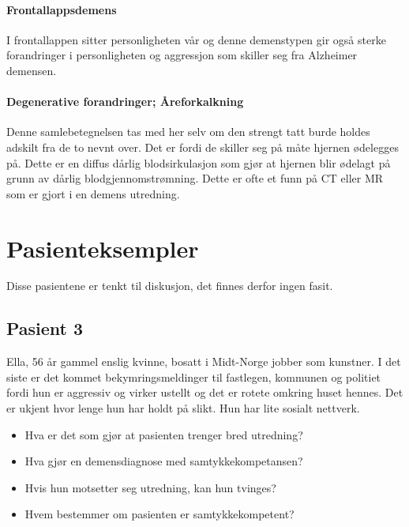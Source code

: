 					\paragraph{Frontallappsdemens\\}
						I frontallappen sitter personligheten vår og denne demenstypen gir også sterke forandringer i personligheten og aggressjon som skiller seg fra Alzheimer demensen.
					\paragraph{Degenerative forandringer; Åreforkalkning\\}
						Denne samlebetegnelsen tas med her selv om den strengt tatt burde holdes adskilt fra de to nevnt over. Det er fordi de skiller seg på måte hjernen ødelegges på. Dette er en diffus dårlig blodsirkulasjon som gjør at hjernen blir ødelagt på grunn av dårlig blodgjennomstrømning. Dette er ofte et funn på CT eller MR som er gjort i en demens utredning.
		\section{Pasienteksempler}
			Disse pasientene er tenkt til diskusjon, det finnes derfor ingen fasit. 
			\subsection{Pasient 3}
				Ella, 56 år gammel enslig kvinne, bosatt i Midt-Norge jobber som kunstner. I det siste er det kommet bekymringsmeldinger til fastlegen, kommunen og politiet fordi hun er aggressiv og virker ustellt og det er rotete omkring huset hennes. Det er ukjent hvor lenge hun har holdt på slikt. Hun har lite sosialt nettverk.\\
					\begin{itemize}
						\item Hva er det som gjør at pasienten trenger bred utredning?\\
						\item Hva gjør en demensdiagnose med samtykkekompetansen?\\
						\item Hvis hun motsetter seg utredning, kan hun tvinges?\\
						\item Hvem bestemmer om pasienten er samtykkekompetent?\\
					\end{itemize}
